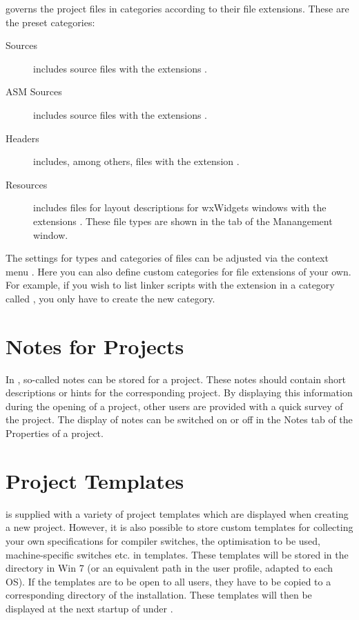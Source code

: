 \codeblocks governs the project files in categories according to their file extensions. These are the preset categories:

\begin{description}
\item[Sources] includes source files with the extensions .
\item[ASM Sources] includes source files with the extensions .
\item[Headers] includes, among others, files with the extension .
\item[Resources] includes files for layout descriptions for wxWidgets windows with the extensions . These file types are shown in the  tab of the Manangement window.
\end{description}

The settings for types and categories of files can be adjusted via the context menu . Here you can also define custom categories for file extensions of your own. For example, if you wish to list linker scripts with the  extension in a category called , you only have to create the new category.


\section{Notes for Projects}

In \codeblocks, so-called notes can be stored for a project. These notes should contain short descriptions or hints for the corresponding project. By displaying this information during the opening of a project, other users are provided with a quick survey of the project. The display of notes can be switched on or off in the Notes tab of the Properties of a project.

\section{Project Templates}

\codeblocks is supplied with a variety of project templates which are displayed when creating a new project. However, it is also possible to store custom templates for collecting your own specifications for compiler switches, the optimisation to be used, machine-specific switches etc. in templates. These templates will be stored in the  directory in Win 7 (or an equivalent path in the user profile, adapted to each OS). If the templates are to be open to all users, they have to be copied to a corresponding directory of the \codeblocks installation. These templates will then be displayed at the next startup of \codeblocks under .


